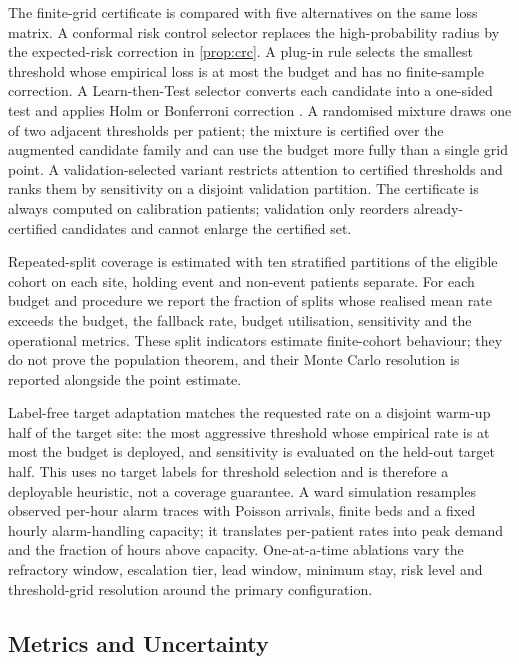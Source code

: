 The finite-grid certificate is compared with five alternatives on the same loss matrix. A conformal risk control selector replaces the high-probability radius by the expected-risk correction in \cref{prop:crc}. A plug-in rule selects the smallest threshold whose empirical loss is at most the budget and has no finite-sample correction. A Learn-then-Test selector converts each candidate into a one-sided test and applies Holm or Bonferroni correction \citep{angelopoulos2021learn}. A randomised mixture draws one of two adjacent thresholds per patient; the mixture is certified over the augmented candidate family and can use the budget more fully than a single grid point. A validation-selected variant restricts attention to certified thresholds and ranks them by sensitivity on a disjoint validation partition. The certificate is always computed on calibration patients; validation only reorders already-certified candidates and cannot enlarge the certified set.

Repeated-split coverage is estimated with ten stratified partitions of the eligible cohort on each site, holding event and non-event patients separate. For each budget and procedure we report the fraction of splits whose realised mean rate exceeds the budget, the fallback rate, budget utilisation, sensitivity and the operational metrics. These split indicators estimate finite-cohort behaviour; they do not prove the population theorem, and their Monte Carlo resolution is reported alongside the point estimate.

Label-free target adaptation matches the requested rate on a disjoint warm-up half of the target site: the most aggressive threshold whose empirical rate is at most the budget is deployed, and sensitivity is evaluated on the held-out target half. This uses no target labels for threshold selection and is therefore a deployable heuristic, not a coverage guarantee. A ward simulation resamples observed per-hour alarm traces with Poisson arrivals, finite beds and a fixed hourly alarm-handling capacity; it translates per-patient rates into peak demand and the fraction of hours above capacity. One-at-a-time ablations vary the refractory window, escalation tier, lead window, minimum stay, risk level and threshold-grid resolution around the primary configuration.

\subsection{Metrics and Uncertainty}

